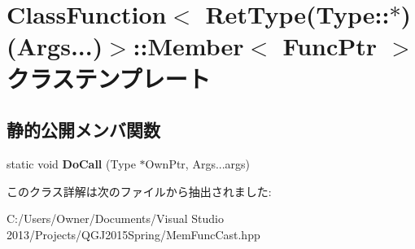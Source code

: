 \hypertarget{class_class_function_3_01_ret_type_07_type_1_1_5_08_07_args_8_8_8_08_4_1_1_member}{}\section{Class\+Function$<$ Ret\+Type(Type\+:\+:$\ast$)(Args...)$>$\+:\+:Member$<$ Func\+Ptr $>$ クラステンプレート}
\label{class_class_function_3_01_ret_type_07_type_1_1_5_08_07_args_8_8_8_08_4_1_1_member}
\subsection*{静的公開メンバ関数}
\begin{DoxyCompactItemize}
\item 
static void {\bfseries Do\+Call} (Type $\ast$Own\+Ptr, Args...\+args)\hypertarget{class_class_function_3_01_ret_type_07_type_1_1_5_08_07_args_8_8_8_08_4_1_1_member_a096bac68cec7ff801a992ba51e8f97e6}{}\label{class_class_function_3_01_ret_type_07_type_1_1_5_08_07_args_8_8_8_08_4_1_1_member_a096bac68cec7ff801a992ba51e8f97e6}

\end{DoxyCompactItemize}


このクラス詳解は次のファイルから抽出されました\+:\begin{DoxyCompactItemize}
\item 
C\+:/\+Users/\+Owner/\+Documents/\+Visual Studio 2013/\+Projects/\+Q\+G\+J2015\+Spring/Mem\+Func\+Cast.\+hpp\end{DoxyCompactItemize}
